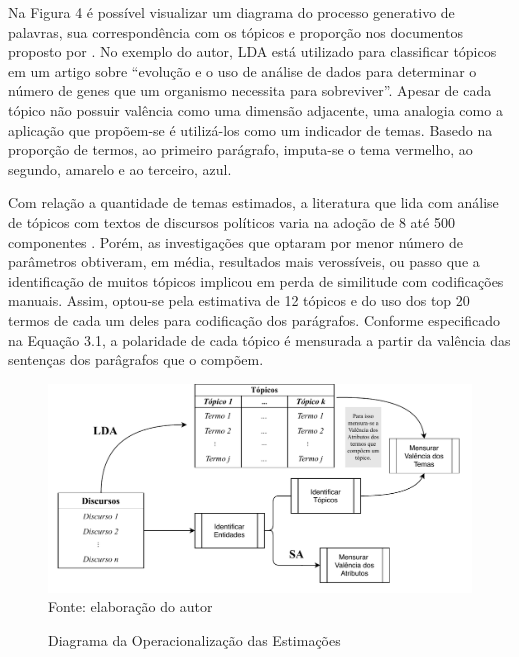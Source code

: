 \documentclass[
12pt,				%
openright,			%
twoside,			%
a4paper,			%
english,			%
french,				%
spanish,			%
brazil				%
]{abntex2}
\begin{document}
Na Figura 4 é possível visualizar um diagrama do processo generativo de palavras, sua correspondência com os tópicos e proporção nos documentos proposto por . No exemplo do autor, LDA está utilizado para classificar tópicos em um artigo sobre ``evolução e o uso de análise de dados para determinar o número de genes que um organismo necessita para sobreviver''. Apesar de cada tópico não possuir valência como uma dimensão adjacente, uma analogia como a aplicação que propõem-se é utilizá-los como um indicador de temas. Basedo na proporção de termos, ao primeiro parágrafo, imputa-se o tema vermelho, ao segundo, amarelo e ao terceiro, azul. 

Com relação a quantidade de temas estimados, a literatura que lida com análise de tópicos com textos de discursos políticos varia na adoção de 8 até 500 componentes \cite{chen2010opinion, fang2012mining, balasubramanyan2012modeling, balasubramanyan2012modeling, cohen2013classifying, song2014analyzing, levy2014driving, van2014lda,zirn2014multidimensional}. Porém, as investigações que optaram por menor número de parâmetros obtiveram, em média, resultados mais verossíveis, ou passo que a identificação de muitos tópicos implicou em perda de similitude com codificações manuais. Assim, optou-se pela estimativa de 12 tópicos e do uso dos top 20 termos de cada um deles para codificação dos parágrafos. Conforme especificado na Equação 3.1, a polaridade de cada tópico é mensurada a partir da valência das sentenças dos parâgrafos que o compõem.  
 
\begin{figure}[h]
	\caption{Diagrama da Operacionalização das Estimações}
	\label{fig:diagram_op}
	\centering
	\includegraphics[width=1\linewidth]{figures/diagrama_operacionalizacao}
	Fonte: elaboração do autor
\end{figure}
 
\end{document}
